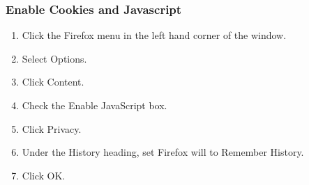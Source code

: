 \documentclass[hidelinks,english]{article}
\begin{document}
            \subsubsection{Enable Cookies and Javascript}
            \begin{enumerate}
                \item Click the Firefox menu in the left hand corner of the window.
                \item Select Options.
                \item Click Content.
                \item Check the Enable JavaScript box.
                \item Click Privacy.
                \item Under the History heading, set Firefox will to Remember History.
                \item Click OK.
            \end{enumerate}
            \begin{center}
            \end{center}
        \newpage
\end{document}
